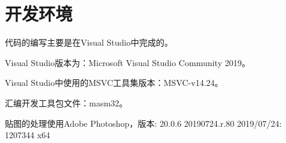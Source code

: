 %
%
%
%
%

\chapter{开发环境}
代码的编写主要是在Visual Studio中完成的。
\par
Visual Studio版本为：Microsoft Visual Studio Community 2019。
\par
Visual Studio中使用的MSVC工具集版本：MSVC-v14.24。
\par
汇编开发工具包文件：masm32。
\par
贴图的处理使用Adobe Photoshop，版本: 20.0.6 20190724.r.80 2019/07/24: 1207344  x64

